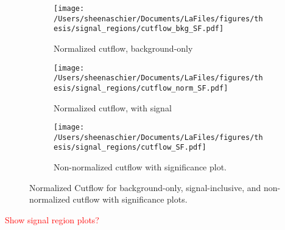 \begin{figure}[h!]
\centering
\begin{subfigure}[b]{0.47\textwidth}
\texttt{[image: /Users/sheenaschier/Documents/LaFiles/figures/thesis/signal\_regions/cutflow\_bkg\_SF.pdf]}
\caption{Normalized cutflow, background-only}
\end{subfigure}
 \begin{subfigure}[b]{0.47\textwidth}
\texttt{[image: /Users/sheenaschier/Documents/LaFiles/figures/thesis/signal\_regions/cutflow\_norm\_SF.pdf]}
 \caption{Normalized cutflow, with signal}
\end{subfigure}
\begin{subfigure}[b]{0.58\textwidth}
\texttt{[image: /Users/sheenaschier/Documents/LaFiles/figures/thesis/signal\_regions/cutflow\_SF.pdf]}
 \caption{Non-normalized cutflow with significance plot.}
\end{subfigure}

 \caption{Normalized Cutflow for background-only, signal-inclusive, and  non-normalized cutflow with significance plots. }
 \label{fig:cutflow_norm}
\end{figure}

\textcolor{red}{Show signal region plots?}
\fi



